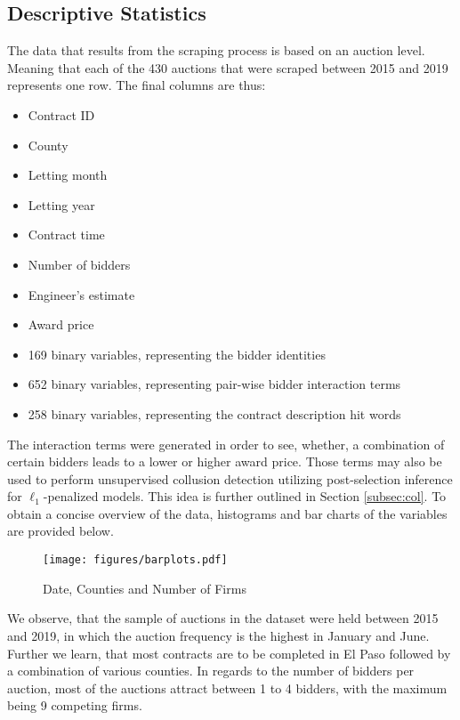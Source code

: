 \documentclass[a4paper,12pt, headsepline]{scrartcl}
\numberwithin{equation}{section}
\begin{document}
\subsection{Descriptive Statistics}\label{subsec:desc}
The data that results from the scraping process is based on an auction level. Meaning that each of the 430 auctions that were scraped between 2015 and 2019 represents one row. The final columns are thus:

\begin{itemize}
	\item Contract ID
	\item County
	\item Letting month
	\item Letting year
	\item Contract time
	\item Number of bidders
	\item Engineer's estimate
	\item Award price
	\item 169 binary variables, representing the bidder identities
	\item 652 binary variables, representing pair-wise bidder interaction terms 
	\item 258 binary variables, representing the contract description hit words
\end{itemize}

The interaction terms were generated in order to see, whether, a combination of certain bidders leads to a lower or higher award price. Those terms may also be used to perform unsupervised collusion detection utilizing post-selection inference for $\ell_1$-penalized models. This idea is further outlined in Section \ref{subsec:col}. To obtain a concise overview of the data,  histograms and bar charts of the variables are provided below.

\begin{figure}[H]
	\texttt{[image: figures/barplots.pdf]}
	\caption{Date, Counties and Number of Firms}\label{fig:barplots}
\end{figure}

We observe, that the sample of auctions in the dataset were held between 2015 and 2019, in which the auction frequency is the highest in January and June. Further we learn, that most contracts are to be completed in El Paso followed by a combination of various counties. In regards to the number of bidders per auction, most of the auctions attract between 1 to 4 bidders, with the maximum being 9 competing firms.
\end{document}
